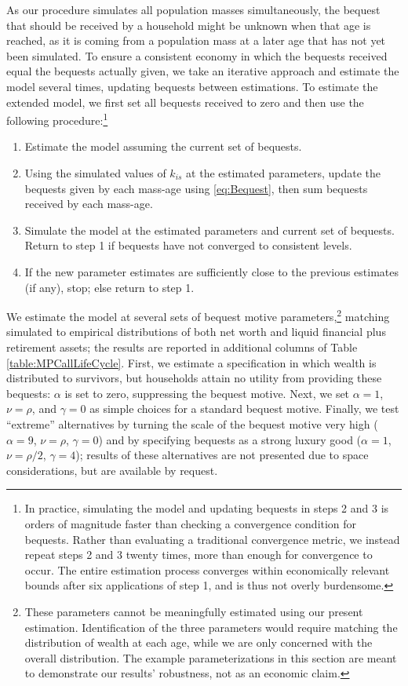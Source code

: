 \documentclass[11pt,a4paper,pdftex]{article}\usepackage[pdftex]{graphicx}\usepackage{epstopdf} \usepackage[pdftex]{hyperref}
\newcommand{\kRat}{\ensuremath{k}}
\begin{document}
As our procedure simulates all population masses simultaneously, the bequest that should be received by a household might be unknown when that age is reached, as it is coming from a population mass at a later age that has not yet been simulated.  To ensure a consistent economy in which the bequests received equal the bequests actually given, we take an iterative approach and estimate the model several times, updating bequests between estimations.  To estimate the extended model, we first set all bequests received to zero and then use the following procedure:\footnote{In practice, simulating the model and updating bequests in steps 2 and 3 is orders of magnitude faster than checking a convergence condition for bequests.  Rather than evaluating a traditional convergence metric, we instead repeat steps 2 and 3 twenty times, more than enough for convergence to occur.  The entire estimation process converges within economically relevant bounds after six applications of step 1, and is thus not overly burdensome.}
\begin{enumerate}
\item Estimate the model assuming the current set of bequests.

\item Using the simulated values of $\kRat_{is}$ at the estimated parameters, update the bequests given by each mass-age using \eqref{eq:Bequest}, then sum bequests received by each mass-age.

\item Simulate the model at the estimated parameters and current set of bequests. Return to step 1 if bequests have not converged to consistent levels.

\item If the new parameter estimates are sufficiently close to the previous estimates (if any), stop; else return to step 1.
\end{enumerate}

We estimate the model at several sets of bequest motive parameters,\footnote{These parameters cannot be meaningfully estimated using our present estimation.  Identification of the three parameters would require matching the distribution of wealth at each age, while we are only concerned with the overall distribution.  The example parameterizations in this section are meant to demonstrate our results' robustness, not as an economic claim.} matching simulated to empirical distributions of both net worth and liquid financial plus retirement assets; the results are reported in additional columns of Table \ref{table:MPCallLifeCycle}.  First, we estimate a specification in which wealth is distributed to survivors, but households attain no utility from providing these bequests: $\alpha$ is set to zero, suppressing the
bequest motive.  Next, we set $\alpha = 1$, $\nu = \rho$, and $\gamma = 0$ as simple choices for a standard bequest motive.  Finally, we test ``extreme'' alternatives by turning the scale of the bequest motive very high ($\alpha = 9$, $\nu = \rho$, $\gamma = 0$) and by specifying bequests as a strong luxury good ($\alpha = 1$, $\nu = \rho/2$, $\gamma = 4$); results of these alternatives are not presented due to space considerations, but are available by request.
\end{document}
